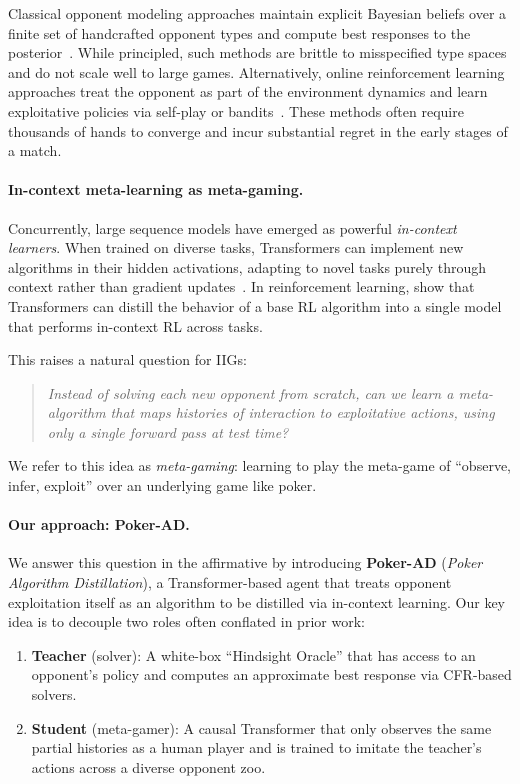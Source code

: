 \documentclass{article}
\begin{document}
Classical opponent modeling approaches maintain explicit Bayesian beliefs over a finite set of handcrafted opponent types and compute best responses to the posterior~\citep{southey2005bayesbluff,ganzfried2018bayesian}. While principled, such methods are brittle to misspecified type spaces and do not scale well to large games. Alternatively, online reinforcement learning approaches treat the opponent as part of the environment dynamics and learn exploitative policies via self-play or bandits~\citep{heinrich2016nfsp,nashed2022opponentSurvey}. These methods often require thousands of hands to converge and incur substantial regret in the early stages of a match.

\paragraph{In-context meta-learning as meta-gaming.}
Concurrently, large sequence models have emerged as powerful \emph{in-context learners}. When trained on diverse tasks, Transformers can implement new algorithms in their hidden activations, adapting to novel tasks purely through context rather than gradient updates~\citep{duan2016rl2,wang2016learning2rl,chen2021decisiontransformer,laskin2023context}. In reinforcement learning, \citet{laskin2023context} show that Transformers can distill the behavior of a base RL algorithm into a single model that performs in-context RL across tasks.

This raises a natural question for IIGs:

\begin{quote}
    \emph{Instead of solving each new opponent from scratch, can we learn a \emph{meta-algorithm} that maps histories of interaction to exploitative actions, using only a single forward pass at test time?}
\end{quote}

We refer to this idea as \emph{meta-gaming}: learning to play the meta-game of ``observe, infer, exploit'' over an underlying game like poker.

\paragraph{Our approach: Poker-AD.}
We answer this question in the affirmative by introducing \textbf{Poker-AD} (\emph{Poker Algorithm Distillation}), a Transformer-based agent that treats opponent exploitation itself as an algorithm to be distilled via in-context learning. Our key idea is to decouple two roles often conflated in prior work:
\begin{enumerate}[leftmargin=*]
    \item \textbf{Teacher} (solver): A white-box ``Hindsight Oracle'' that has access to an opponent's policy and computes an approximate best response via CFR-based solvers.
    \item \textbf{Student} (meta-gamer): A causal Transformer that only observes the same partial histories as a human player and is trained to imitate the teacher's actions across a diverse opponent zoo.
\end{enumerate}
\end{document}
